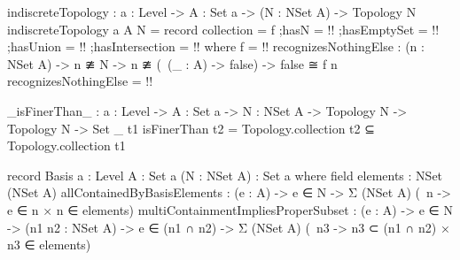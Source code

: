 \begin{code}
indiscreteTopology : {a : Level} -> {A : Set a} -> (N : NSet A) -> Topology N
indiscreteTopology {a} {A} N = record
  {collection = f
  ;hasN = {!!}
  ;hasEmptySet = {!!}
  ;hasUnion = {!!}
  ;hasIntersection = {!!}
  }
  where
  f = {!!}
  recognizesNothingElse :
    (n : NSet A) ->
    n ≇ N ->
    n ≇ (\ (_ : A) -> false) ->
    false ≅ f n
  recognizesNothingElse = {!!}
  
_isFinerThan_ : {a : Level} ->
                {A : Set a} ->
                {N : NSet A} ->
                Topology N ->
                Topology N ->
                Set _
t1 isFinerThan t2 = Topology.collection t2 ⊆ Topology.collection t1

record Basis {a : Level}
             {A : Set a}
             (N : NSet A) : Set a where
  field
   elements : NSet (NSet A)
   allContainedByBasisElements :
     (e : A) ->
     e ∈ N ->
     Σ (NSet A) (\ n -> e ∈ n × n ∈ elements)
   multiContainmentImpliesProperSubset :
     (e : A) ->
     e ∈ N ->
     (n1 n2 : NSet A) ->
     e ∈ (n1 ∩ n2) ->
     Σ (NSet A) (\ n3 -> n3 ⊂ (n1 ∩ n2) × n3 ∈ elements)
\end{code}
